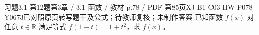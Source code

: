 \par\noindent\begin{minipage}{\linewidth}
\begin{bankitem}{习题3.1 第12题}{第3章 / 3.1 函数 / 教材 p.78 / PDF 第85页}{XJ-B1-C03-HW-P078-Y0673}{已对照原页转写题干及公式；待教师复核；未制作答案}
已知函数 $f(x)$ 对任意 $t\in\mathbb R$ 满足等式 $f(1-t)=1+t^2$，求 $f(x)$。
\end{bankitem}
\end{minipage}\par\medskip

